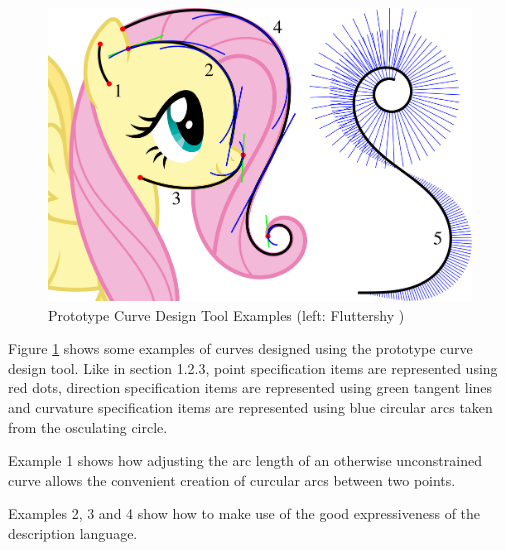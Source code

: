 \documentclass[a4paper]{article}
\begin{document}
			\begin{figure}[htbp]
				\centering
				\includegraphics[width=\textwidth]{../resources/examples_prototype.pdf}
				\caption{Prototype Curve Design Tool Examples (left: Fluttershy \cite{fluttershy})}
				\label{figure:examples_prototype}
			\end{figure}

			Figure \ref{figure:examples_prototype} shows some examples of curves designed using the prototype curve design tool. Like in section 1.2.3, point specification items are represented using red dots, direction specification items are represented using green tangent lines and curvature specification items are represented using blue circular arcs taken from the osculating circle.

			Example 1 shows how adjusting the arc length of an otherwise unconstrained curve allows the convenient creation of curcular arcs between two points.

			Examples 2, 3 and 4 show how to make use of the good expressiveness of the description language.

\end{document}
